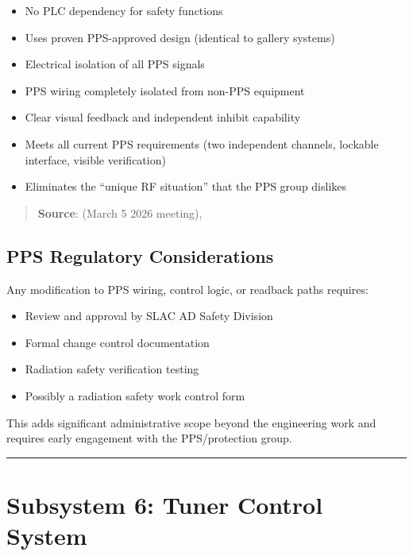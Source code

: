 \begin{itemize}
\tightlist
\item
  No PLC dependency for safety functions
\item
  Uses proven PPS-approved design (identical to gallery systems)
\item
  Electrical isolation of all PPS signals
\item
  PPS wiring completely isolated from non-PPS equipment
\item
  Clear visual feedback and independent inhibit capability
\item
  Meets all current PPS requirements (two independent channels, lockable interface, visible verification)
\item
  Eliminates the ``unique RF situation'' that the PPS group dislikes
\end{itemize}

\begin{quote}
\textbf{Source}:  (March 5 2026 meeting), 
\end{quote}

\subsection{PPS Regulatory Considerations}\label{pps-regulatory-considerations}

Any modification to PPS wiring, control logic, or readback paths requires:

\begin{itemize}
\tightlist
\item
  Review and approval by SLAC AD Safety Division
\item
  Formal change control documentation
\item
  Radiation safety verification testing
\item
  Possibly a radiation safety work control form
\end{itemize}

This adds significant administrative scope beyond the engineering work and requires early engagement with the PPS/protection group.

\begin{center}\rule{0.5\linewidth}{0.5pt}\end{center}

\section{Subsystem 6: Tuner Control System}\label{subsystem-6-tuner-control-system}

